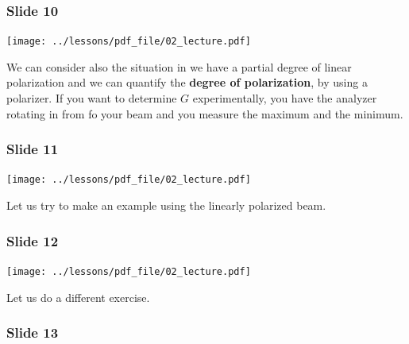 \documentclass[../main/main.tex]{subfiles}
\begin{document}
\subsubsection*{Slide 10}

\begin{minipage}[]{0.5\linewidth}
\centering
\texttt{[image: ../lessons/pdf\_file/02\_lecture.pdf]}
\end{minipage}
\hspace{0.3cm}\vspace{0.3cm}
\begin{minipage}[c]{0.47\linewidth}
We can consider also the situation in we have a partial degree of linear polarization and we can quantify the \textbf{degree of polarization}, by using a polarizer. If you want to determine \( G \) experimentally, you have the analyzer rotating in from fo your beam and you measure the maximum and the minimum.
\end{minipage}

\subsubsection*{Slide 11}

\begin{minipage}[]{0.5\linewidth}
\centering
\texttt{[image: ../lessons/pdf\_file/02\_lecture.pdf]}
\end{minipage}
\hspace{0.3cm}\vspace{0.3cm}
\begin{minipage}[c]{0.47\linewidth}
Let us try to make an example using the linearly polarized beam.
\end{minipage}

\subsubsection*{Slide 12}

\begin{minipage}[]{0.5\linewidth}
\centering
\texttt{[image: ../lessons/pdf\_file/02\_lecture.pdf]}
\end{minipage}
\hspace{0.3cm}\vspace{0.3cm}
\begin{minipage}[c]{0.47\linewidth}
Let us do a different exercise.
\end{minipage}

\subsubsection*{Slide 13}
\end{document}
